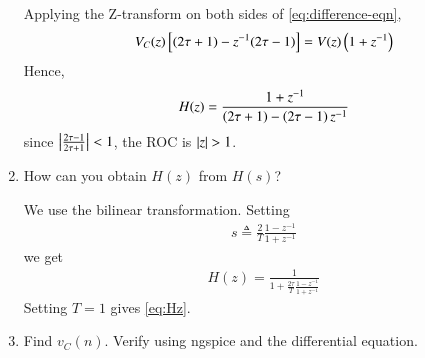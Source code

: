 \documentclass[journal,12pt,twocolumn]{IEEEtran}
\renewcommand\thesection{\arabic{section}}
\begin{document}
\begin{enumerate}[label=\arabic*.,ref=\thesection.\theenumi]
\solution Applying the Z-transform on both sides of \eqref{eq:difference-eqn},
\begin{align}
    V_C(z){}\left[(2\tau + 1) - z^{-1}(2\tau - 1)\right] = V(z)\left(1 + z^{-1}\right)
\end{align}
Hence,
\begin{align}
    H(z) = \frac{1+z^{-1}}{\left(2\tau+1\right)-\left(2\tau-1\right)z^{-1}}
    \label{eq:Hz}
\end{align}
since $\left\vert\frac{2\tau-1}{2\tau+1}\right\vert < 1$, the ROC is $\left\vert z\right\vert > 1$.
\item How can you obtain $H(z)$ from $H(s)$?

\solution We use the bilinear transformation. Setting
\begin{align}
    s \triangleq \frac{2}{T}\frac{1 - z^{-1}}{1 + z^{-1}}
\end{align}
we get
\begin{align}
    H(z) = \frac{1}{1 + \frac{2\tau}{T}\frac{1-z^{-1}}{1+z^{-1}}}
\end{align}
Setting $T = 1$ gives \eqref{eq:Hz}.

\item Find $v_C(n)$. Verify using ngspice and the differential equation.


\end{enumerate}
\end{document}
